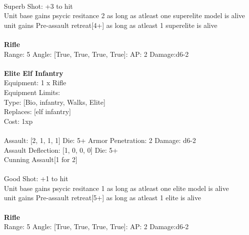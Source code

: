 \ \\
Superb Shot: +3 to hit\\ 
Unit base gains psycic resitance 2 as long as atleast one superelite model is alive\\ 
unit gains Pre-assault retreat[4+] as long as atleast 1 superelite is alive\\ 

\ \\
{\bf Rifle } \\



Range: 5  Angle: [True, True, True, True]: AP: 2 Damage:d6-2 \\




 
\ \\

{\bf Elite Elf Infantry } \\
Equipment: 1 x Rifle \\
Equipment Limits:  \\
Type: [Bio, infantry, Walks, Elite] \\
Replaces: [elf infantry] \\
Cost: 1xp\\
\ \\
Assault: [2, 1, 1, 1] Die: 5+ Armor Penetration: 2 Damage: d6-2 \\
Assault Deflection: [1, 0, 0, 0] Die: 5+\\
\indent Cunning Assault[1 for 2]\\ 
 
\ \\
Good Shot: +1 to hit\\ 
Unit base gains psycic resitance 1 as long as atleast one elite model is alive\\ 
unit gains Pre-assault retreat[5+] as long as atleast 1 elite is alive\\ 

\ \\
{\bf Rifle } \\



Range: 5  Angle: [True, True, True, True]: AP: 2 Damage:d6-2 \\




 
\ \\

